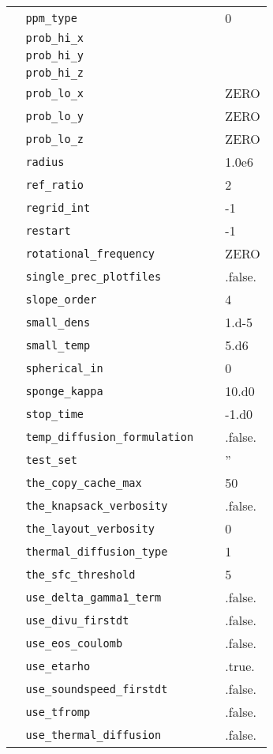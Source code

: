 {\begin{center}
\begin{longtable}{|l|p{3.25in}|l|}
\verb=  ppm_type =  &   &  0 \\
\verb=  prob_hi_x =  &   &  \\
\verb=  prob_hi_y =  &   &  \\
\verb=  prob_hi_z =  &   &  \\
\verb=  prob_lo_x =  &   &  ZERO \\
\verb=  prob_lo_y =  &   &  ZERO \\
\verb=  prob_lo_z =  &   &  ZERO \\
\verb=  radius =  &   &  1.0e6 \\
\verb=  ref_ratio =  &   &  2 \\
\verb=  regrid_int =  &   &  -1 \\
\verb=  restart =  &   & -1 \\
\verb=  rotational_frequency =  &   &  ZERO \\
\verb=  single_prec_plotfiles =  &   &  .false. \\
\verb=  slope_order =  &   &  4 \\
\verb=  small_dens =  &   &  1.d-5 \\
\verb=  small_temp =  &   &  5.d6 \\
\verb=  spherical_in =  &   &  0 \\
\verb=  sponge_kappa =  &   &  10.d0 \\
\verb=  stop_time =  &   &  -1.d0 \\
\verb=  temp_diffusion_formulation =  &   &  .false. \\
\verb=  test_set =  &   &  '' \\
\verb=  the_copy_cache_max =  &   & 50 \\
\verb=  the_knapsack_verbosity =  &   &  .false. \\
\verb=  the_layout_verbosity =  &   &  0 \\
\verb=  thermal_diffusion_type =  &   &  1 \\
\verb=  the_sfc_threshold =  &   & 5 \\
\verb=  use_delta_gamma1_term =  &   &  .false. \\
\verb=  use_divu_firstdt =  &   &  .false. \\
\verb=  use_eos_coulomb =  &   &  .false. \\
\verb=  use_etarho =  &   &  .true. \\
\verb=  use_soundspeed_firstdt =  &   &  .false. \\
\verb=  use_tfromp =  &   &  .false. \\
\verb=  use_thermal_diffusion =  &   &  .false. \\

\end{longtable}
\end{center}}
